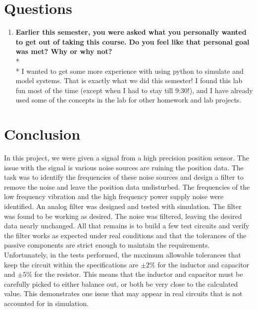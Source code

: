 \documentclass[12pt]{report}
\providecommand{\tightlist}{%
\setlength{\itemsep}{0pt}\setlength{\parskip}{0pt}}
\def\br{\hspace*{\fill} \\* }
\begin{document}
\pagebreak

\hypertarget{questions}{%
\chapter{Questions}\label{questions}}

\begin{enumerate}
\def\labelenumi{\arabic{enumi}.}
\tightlist
\item
  \textbf{Earlier this semester, you were asked what you personally
  wanted to get out of taking this course. Do you feel like that
  personal goal was met? Why or why not?} \br \br 
  I wanted to get some more experience with using python to simulate and model systems. That is exactly what we did this semester! I found this lab fun most of the time (except when I had to stay till 9:30!), and I have already used some of the concepts in the lab for other homework and lab projects.
\end{enumerate}

\hypertarget{conclusion}{%
\chapter{Conclusion}\label{conclusion}}

In this project, we were given a signal from a high precision position
sensor. The issue with the signal is various noise sources are ruining
the position data. The task was to identify the frequencies of these
noise sources and design a filter to remove the noise and leave the
position data undisturbed. The frequencies of the low frequency
vibration and the high frequency power supply noise were identified. An
analog filter was designed and tested with simulation.  The filter was found to be working as desired. The noise was filtered, leaving the desired data
nearly unchanged. All that remains is to build a few test circuits and
verify the filter works as expected under real conditions and that
the tolerances of the passive components are strict enough to maintain
the requirements. Unfortunately, in the tests performed, the maximum
allowable tolerances that keep the circuit within the specifications are
$\pm 2\% $ for the inductor and capacitor and $\pm 5\% $ for the
resistor. This means that the inductor and capacitor must be carefully
picked to either balance out, or both be very close to the calculated value. This demonstrates
one issue that may appear in real circuits that is not accounted for in
simulation.

    
    \pagebreak
    
    
\end{document}
